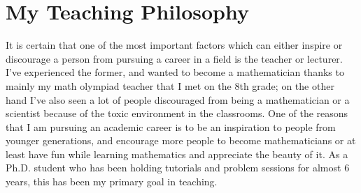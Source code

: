 \documentclass{article}
\begin{document}
\newcommand{\frakA}{{\mathfrak A}}
\newcommand{\frakB}{{\mathfrak B}}
\newcommand{\frakC}{{\mathfrak C}}
\newcommand{\frakD}{{\mathfrak D}}
\newcommand{\frakE}{{\mathfrak E}}
\newcommand{\frakF}{{\mathfrak F}}
\newcommand{\frakG}{{\mathfrak G}}
\newcommand{\frakH}{{\mathfrak H}}
\newcommand{\frakI}{{\mathfrak I}}
\newcommand{\frakJ}{{\mathfrak J}}
\newcommand{\frakK}{{\mathfrak K}}
\newcommand{\frakL}{{\mathfrak L}}
\newcommand{\frakM}{{\mathfrak M}}
\newcommand{\frakN}{{\mathfrak N}}
\newcommand{\frakO}{{\mathfrak O}}
\newcommand{\frakP}{{\mathfrak P}}
\newcommand{\frakQ}{{\mathfrak Q}}
\newcommand{\frakR}{{\mathfrak R}}
\newcommand{\frakS}{{\mathfrak S}}
\newcommand{\frakT}{{\mathfrak T}}
\newcommand{\frakU}{{\mathfrak U}}
\newcommand{\frakV}{{\mathfrak V}}
\newcommand{\frakW}{{\mathfrak W}}
\newcommand{\frakX}{{\mathfrak X}}
\newcommand{\frakY}{{\mathfrak Y}}
\newcommand{\frakZ}{{\mathfrak Z}}





\newcommand{\Zbar}{{\overline{\bbZ}}}
\newcommand{\kbar}{{\overline{k}}}
\newcommand{\Kbar}{{\overline{K}}}
\newcommand{\Fbar}{{\overline{\bbF}}}
\newcommand{\Vbar}{{\overline{V}}}
\newcommand{\Ybar}{{\overline{Y}}}
\newcommand{\Ubar}{{\overline{U}}}
\newcommand{\Cbar}{{\overline{C}}}
\newcommand{\Lbar}{{\overline{L}}}
\newcommand{\pbar}{{\overline{p}}}
\newcommand{\barQ}{{\overline{\bbQ}}}


\newcommand{\AK}{{\bbA^{\times}_K}}
\newcommand{\AF}{{\bbA^{\times}_F}}
\newcommand{\AM}{{\bbA^{\times}_M}}





\newcommand{\Zhat}{{\hat{\bbZ}}}


\newcommand{\OK}{{\mathcal{O}_K}}
\newcommand{\Ov}{{\mathcal{O}_v}}
\newcommand{\Tf}{{\mathbb{T}_f}}
\newcommand{\Tfac}{{\mathbb{T}_f^{ac}}}
\newcommand{\Tfxac}{{\mathbb{T}_{f,\chi}^{ac}}}
\newcommand{\Tfx}{{\mathbb{T}_{f,\chi}}}
\newcommand{\frakfx}{{\mathfrak f}_{\chi}}

\section*{My Teaching Philosophy}

\par It is certain that one of the most important factors which can either inspire or discourage a person from pursuing a career in a field is the teacher or lecturer. I've experienced the former, and wanted to become a mathematician thanks to mainly my math olympiad teacher that I met on the 8th grade; on the other hand I've also seen a lot of people discouraged from being a mathematician or a scientist because of the toxic environment in the classrooms. One of the reasons that I am pursuing an academic career is to be an inspiration to people from younger generations, and encourage more people to become mathematicians or at least have fun while learning mathematics and appreciate the beauty of it. As a Ph.D. student who has been holding tutorials and problem sessions for almost 6 years, this has been my primary goal in teaching.
\end{document}
